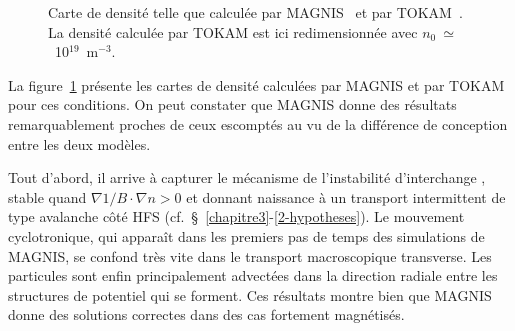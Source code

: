\begin{refsection}
\begin{figure}[!htbp]
  \centering
    \caption{Carte de densité telle que calculée par MAGNIS~
et par TOKAM~. La densité calculée par TOKAM est ici
redimensionnée avec $n_0~\simeq$~10$^{19}$~m$^{-3}$.}
    \label{4-TokamDensite}
\end{figure}


La figure~\ref{4-TokamDensite} présente les cartes de densité
calculées par MAGNIS et par TOKAM pour ces conditions. On peut
constater que MAGNIS donne des résultats remarquablement proches de ceux
escomptés au vu de la différence de conception entre les deux modèles. 

Tout d'abord, il arrive à capturer le mécanisme de l'instabilité d'interchange ,
stable quand $\nabla 1/B\cdot\nabla n>0$ et donnant naissance à un transport intermittent de
type avalanche côté HFS (cf.~\S~\ref{chapitre3}-\ref{2-hypotheses}). Le
mouvement cyclotronique, qui apparaît dans les premiers pas de temps des
simulations de MAGNIS, se confond très vite dans le transport macroscopique
transverse. Les particules sont enfin principalement advectées dans la
direction radiale entre les structures de potentiel qui se forment. Ces
résultats montre bien que MAGNIS donne des solutions correctes dans
des cas fortement magnétisés.


\end{refsection}

